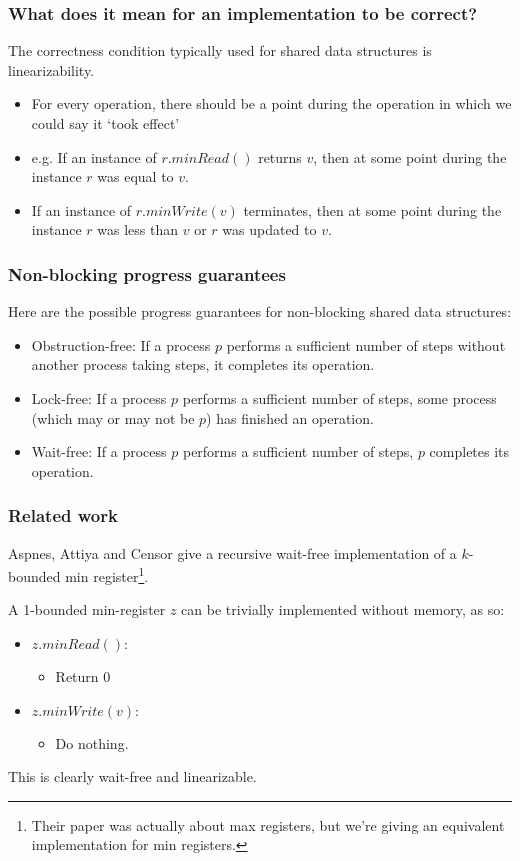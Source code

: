 \documentclass{beamer}
\begin{document}
\begin{frame}
	\frametitle{What does it mean for an implementation to be correct?}
	The correctness condition typically used for shared data structures is linearizability.
	\begin{itemize}
		\item For every operation, there should be a point during the operation in which we could say it `took effect'
		\item e.g. If an instance of $r.minRead()$ returns $v$, then at some point during the instance $r$ was equal to $v$.
		\item If an instance of $r.minWrite(v)$ terminates, then at some point during the instance $r$ was less than $v$ or $r$ was updated to $v$.
	\end{itemize}
\end{frame}
\begin{frame}
	\frametitle{Non-blocking progress guarantees}
	Here are the possible progress guarantees for non-blocking shared data structures:
	\begin{itemize}
		\item Obstruction-free: If a process $p$ performs a sufficient number 
		of steps without another process taking steps, it completes its operation.
		\item Lock-free: If a process $p$ performs a sufficient number of steps, 
		some process (which may or may not be $p$) has finished an operation.
		\item Wait-free: If a process $p$ performs a sufficient number of steps, 
		$p$ completes its operation.
	\end{itemize}
\end{frame}
\begin{frame}
	\frametitle{Related work}
	Aspnes, Attiya and Censor give a recursive wait-free implementation of a $k$-bounded min register\footnote{Their paper was actually about max registers, but we're giving an equivalent implementation for min registers.}.

	A 1-bounded min-register $z$ can be trivially implemented without memory, as so:
	\begin{itemize}
		\item $z.minRead():$
			\begin{itemize}
				\item Return 0
			\end{itemize} 
		\item $z.minWrite(v):$
			\begin{itemize}
				\item Do nothing.
			\end{itemize}
	\end{itemize}
	This is clearly wait-free and linearizable.
\end{frame}
\end{document}

